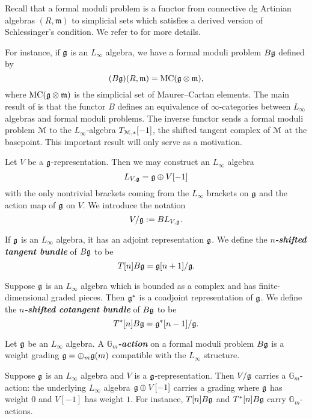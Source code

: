 \documentclass[10pt, oneside]{article}
\newcommand{\Gm}{\mathbb{G}_m}
\newcommand{\defterm}[1]{\textbf{\emph{#1}}}
\begin{document}
Recall that a formal moduli problem is a functor from connective dg Artinian algebras $(R, \mathfrak{m})$ to simplicial sets which satisfies a derived version of Schlessinger's condition. We refer to \cite{DAGX,PridhamFMP,Toen} for more details.

For instance, if $\mathfrak g$ is an $L_\infty$ algebra, we have a formal moduli problem $B\mathfrak g$ defined by
\[(B\mathfrak g)(R, \mathfrak{m})=\mathrm{MC}(\mathfrak g\otimes \mathfrak{m}),\]
where $\mathrm{MC}(\mathfrak g\otimes \mathfrak{m})$ is the simplicial set of Maurer--Cartan elements. The main result of \cite{DAGX,PridhamFMP} is that the functor $B$ defines an equivalence of $\infty$-categories between $L_\infty$ algebras and formal moduli problems. The inverse functor sends a formal moduli problem $\mathcal M$ to the $L_\infty$-algebra $T_{\mathcal M, \ast}[-1]$, the shifted tangent complex of $\mathcal M$ at the basepoint. This important result will only serve as a motivation.

Let $V$ be a $\mathfrak g$-representation. Then we may construct an $L_\infty$ algebra
\[L_{V, \mathfrak g}=\mathfrak g\oplus V[-1]\]
with the only nontrivial brackets coming from the $L_\infty$ brackets on $\mathfrak g$ and the action map of $\mathfrak g$ on $V$. We introduce the notation
\[V/\mathfrak g:= B L_{V, \mathfrak g}.\]

\begin{example}
If $\mathfrak g$ is an $L_\infty$ algebra, it has an adjoint representation $\mathfrak g$. We define the \defterm{$n$-shifted tangent bundle} of $B\mathfrak g$ to be
\[T[n] B\mathfrak g = \mathfrak g[n+1] / \mathfrak g.\]
\label{ex:tangentBg}
\end{example}

\begin{example}
Suppose $\mathfrak g$ is an $L_\infty$ algebra which is bounded as a complex and has finite-dimensional graded pieces. Then $\mathfrak g^*$ is a coadjoint representation of $\mathfrak g$. We define the \defterm{$n$-shifted cotangent bundle} of $B\mathfrak g$ to be
\[T^*[n] B\mathfrak g = \mathfrak g^*[n-1] / \mathfrak g.\]
\label{ex:cotangentBg}
\end{example}

\begin{definition}
Let $\mathfrak g$ be an $L_\infty$ algebra. A \defterm{$\Gm$-action} on a formal moduli problem $B\mathfrak g$ is a weight grading $\mathfrak g = \oplus_m \mathfrak g(m)$ compatible with the $L_\infty$ structure.
\end{definition}

\begin{example}
Suppose $\mathfrak g$ is an $L_\infty$ algebra and $V$ is a $\mathfrak g$-representation. Then $V/\mathfrak g$ carries a $\Gm$-action: the underlying $L_\infty$ algebra $\mathfrak g\oplus V[-1]$ carries a grading where $\mathfrak g$ has weight $0$ and $V[-1]$ has weight $1$. For instance, $T[n] B\mathfrak g$ and $T^*[n] B\mathfrak g$ carry $\Gm$-actions.
\end{example}
\end{document}
